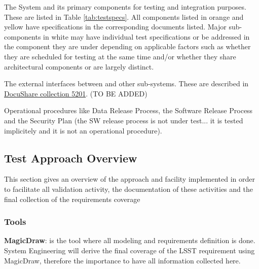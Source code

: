 \begin{itemize_single}

\item The \product{} System and its primary components for testing and integration purposes. These are listed in Table \ref{tab:testspecs}. All components listed in orange and yellow have specifications in the corresponding documents listed. Major sub-components in white may have individual test specifications or be addressed in the component they are under depending on applicable factors such as whether they are scheduled for testing at the same time and/or whether they share architectural components or are largely distinct.

\item The external interfaces between \product{} and other sub-systems. These are described in \href{https://ls.st/Collection-5201}{DocuShare collection 5201}. (TO BE ADDED)


\item Operational procedures like Data Release Process, the Software Release Process and the Security Plan (the SW release process is not under test... it is tested implicitely and it is not an operational procedure).

\end{itemize_single}

\subsection{Test Approach Overview}\label{sect:tsform}

This section gives an overview of the approach and facility implemented in order to facilitate all validation activity, the documentation of these activities and the final collection of the requirements coverage

\subsubsection{Tools}

{\bf MagicDraw}: is the tool where all modeling and requirements definition is done. System Engineering will derive the final coverage of the LSST requirement using MagicDraw, therefore the importance to have all information collected here.

